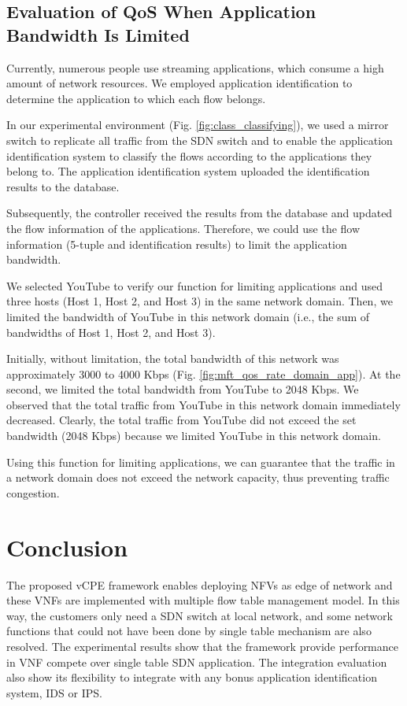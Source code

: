 \documentclass[journal]{IEEEtran}
\begin{document}
\subsection{Evaluation of QoS When Application Bandwidth Is Limited}
Currently, numerous people use streaming applications, which consume a high amount of network resources. We employed application identification to determine the application to which each flow belongs.

In our experimental environment (Fig. \ref{fig:class_classifying}), we used a mirror switch to replicate all traffic from the SDN switch and to enable the application identification system to classify the flows according to the applications they belong to. The application identification system uploaded the identification results to the database.


Subsequently, the controller received the results from the database and updated the flow information of the applications. Therefore, we could use the flow information (5-tuple and identification results) to limit the application bandwidth.

We selected YouTube to verify our function for limiting applications and used three hosts (Host 1, Host 2, and Host 3) in the same network domain. Then, we limited the bandwidth of YouTube in this network domain (i.e., the sum of bandwidths of Host 1, Host 2, and Host 3).

Initially, without limitation, the total bandwidth of this network was approximately 3000 to 4000 Kbps (Fig. \ref{fig:mft_qos_rate_domain_app}). At the  second, we limited the total bandwidth from YouTube to 2048 Kbps. We observed that the total traffic from YouTube in this network domain immediately decreased. Clearly, the total traffic from YouTube did not exceed the set bandwidth (2048 Kbps) because we limited YouTube in this network domain.

Using this function for limiting applications, we can guarantee that the traffic in a network domain does not exceed the network capacity, thus preventing traffic congestion.



\section{Conclusion}
The proposed vCPE framework enables deploying NFVs as edge of network and these VNFs are implemented with multiple flow table management model. In this way, the customers only need a SDN switch at local network, and some network functions that could not have been done by single table mechanism are also resolved. The experimental results show that the framework provide performance in VNF compete over single table SDN application. The integration evaluation also show its flexibility to integrate with any bonus application identification system, IDS or IPS.
\end{document}
